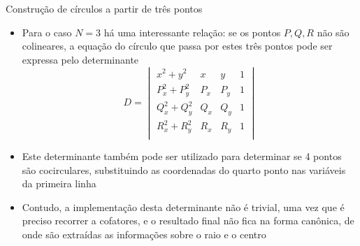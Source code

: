 \begin{frame}[fragile]{Construção de círculos a partir de três pontos}

    \begin{itemize}
        \item Para o caso $N = 3$ há uma interessante relação: se os pontos $P, Q, R$ não são 
            colineares, a equação do círculo que passa por estes três pontos pode ser expressa pelo determinante 
        \[
            D = \begin{vmatrix}
                x^2 + y^2 & x & y & 1 \\
                P_x^2 + P_y^2 & P_x & P_y & 1 \\
                Q_x^2 + Q_y^2 & Q_x & Q_y & 1 \\
                R_x^2 + R_y^2 & R_x & R_y & 1 \\
            \end{vmatrix}
        \]
        \pause

        \item Este determinante também pode ser utilizado para determinar se 4 pontos são cocirculares, substituindo as coordenadas do quarto ponto nas variáveis da primeira linha
        \pause

        \item Contudo, a implementação desta determinante não é trivial, uma vez que é preciso recorrer a cofatores, e o resultado final não fica na forma canônica, de onde são extraídas as informações sobre o raio e o centro
    \end{itemize}

\end{frame}

